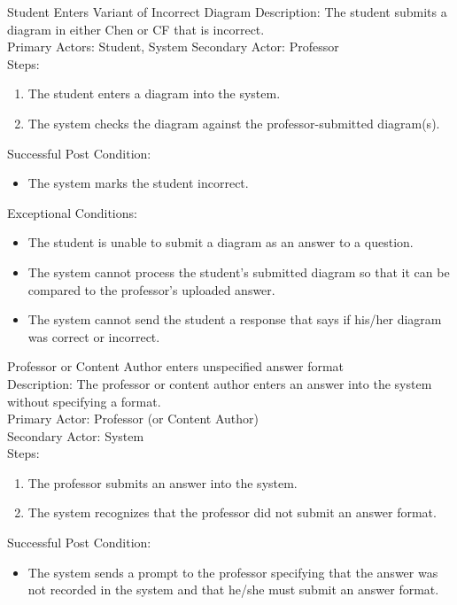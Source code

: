     \begin{section}{Student Enters Variant of Incorrect Diagram}
    Description: The student submits a diagram in either Chen or CF that is incorrect.\\
    Primary Actors: Student, System
    Secondary Actor: Professor\\
    Steps:	
    \begin{enumerate}
    \item The student enters a diagram into the system.
    \item The system checks the diagram against the professor-submitted diagram(s).
    \end{enumerate}
    Successful Post Condition: 
        \begin{itemize}
            \item The system marks the student incorrect.
        \end{itemize}
    Exceptional Conditions:
        \begin{itemize}
            \item The student is unable to submit a diagram as an answer to a question.
            \item The system cannot process the student’s submitted diagram so that it can be compared to the professor’s uploaded answer.
            \item The system cannot send the student a response that says if his/her diagram was correct or incorrect.
        \end{itemize}
    \end{section}
    \begin{section}{Professor or Content}
        Author enters unspecified answer format\\
        Description: The professor or content author enters an answer into the system without specifying a format.\\
        Primary Actor: Professor (or Content Author)\\
        Secondary Actor: System\\
        Steps:	
        \begin{enumerate}
            \item The professor submits an answer into the system.	
            \item The system recognizes that the professor did not submit an answer format.
        \end{enumerate}
            Successful Post Condition: 
                \begin{itemize}
                    \item The system sends a prompt to the professor specifying that the answer was not recorded in the system and that he/she must submit an answer format.
                \end{itemize}
    \end{section}
